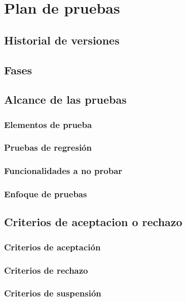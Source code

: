 \chapter{Plan de pruebas}

\section{Historial de versiones}

\section{Fases}

\section{Alcance de las pruebas}
\subsection{Elementos de prueba}

\subsection{Pruebas de regresión}

\subsection{Funcionalidades a no probar}

\subsection{Enfoque de pruebas}

\section{Criterios de aceptacion o rechazo}
\subsection{Criterios de aceptación}

\subsection{Criterios de rechazo}

\subsection{Criterios de suspensión}


